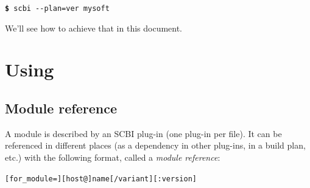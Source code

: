 \documentclass[a4paper,12pt,twoside]{article}
\newcommand{\code}[1]{\texttt{#1}}
\renewcommand{\emph}[1]{\textit{#1}}
\newcommand{\cmd}[1]{\tabto{1cm}\hspace{0.5cm}\texttt{\textbf{\$} #1}}
\let\stdsection\section
\renewcommand\section{\newpage\stdsection}
\newcommand{\ddash}{-{}-}
\begin{document}
\cmd{scbi \ddash{}plan=ver mysoft}

We'll see how to achieve that in this document.


\section{Using}

\subsection{Module reference}
\label{modref}

A module is described by an SCBI plug-in (one plug-in per file). It can be referenced in different places (as a dependency in other plug-ins, in a build plan, etc.) with the following format, called a \emph{module reference}:

\code{[for\_module=][host@]name[/variant][:version]}
\label{dev}
\end{document}
